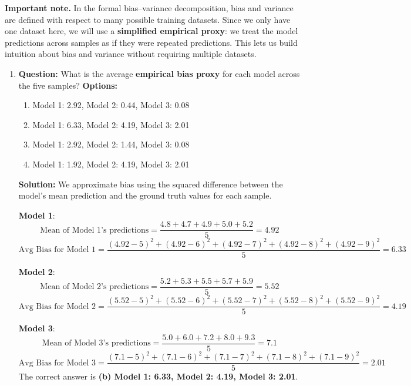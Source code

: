 \documentclass{article}
\begin{document}
\vspace{0.3cm}

\noindent\textbf{Important note.}
In the formal bias--variance decomposition, bias and variance are defined with 
respect to many possible training datasets. Since we only have one dataset here, 
we will use a \textbf{simplified empirical proxy}: we treat the model predictions 
across samples as if they were repeated predictions. This lets us build intuition 
about bias and variance without requiring multiple datasets.

\begin{enumerate}
    \item \textbf{Question:} \newline
    What is the average \textbf{empirical bias proxy} for each model across the five samples?
    \newline \newline
    \textbf{Options:}
    \begin{enumerate}
        \item Model 1: 2.92, Model 2: 0.44, Model 3: 0.08
        \item Model 1: 6.33, Model 2: 4.19, Model 3: 2.01
        \item Model 1: 2.92, Model 2: 1.44, Model 3: 0.08
        \item Model 1: 1.92, Model 2: 4.19, Model 3: 2.01
    \end{enumerate}
    
    \textbf{Solution:} \newline
    We approximate bias using the squared difference between the model’s mean prediction and the ground truth values for each sample.
    \newline
    
    \textbf{Model 1}:
    \[
    \text{Mean of Model 1's predictions} = \frac{4.8 + 4.7 + 4.9 + 5.0 + 5.2}{5} = 4.92
    \]
    \[
    \text{Avg Bias for Model 1} = \frac{(4.92 - 5)^2 + (4.92 - 6)^2 + (4.92 - 7)^2 + (4.92 - 8)^2 + (4.92 - 9)^2}{5} = 6.33
    \]

    \textbf{Model 2}:
    \[
    \text{Mean of Model 2's predictions} = \frac{5.2 + 5.3 + 5.5 + 5.7 + 5.9}{5} = 5.52
    \]
    \[
    \text{Avg Bias for Model 2} = \frac{(5.52 - 5)^2 + (5.52 - 6)^2 + (5.52 - 7)^2 + (5.52 - 8)^2 + (5.52 - 9)^2}{5} = 4.19
    \]

    \textbf{Model 3}:
    \[
    \text{Mean of Model 3's predictions} = \frac{5.0 + 6.0 + 7.2 + 8.0 + 9.3}{5} = 7.1
    \]
    \[
    \text{Avg Bias for Model 3} = \frac{(7.1 - 5)^2 + (7.1 - 6)^2 + (7.1 - 7)^2 + (7.1 - 8)^2 + (7.1 - 9)^2}{5} = 2.01
    \]
    The correct answer is \textbf{(b) Model 1: 6.33, Model 2: 4.19, Model 3: 2.01}.


\end{enumerate}
\end{document}
